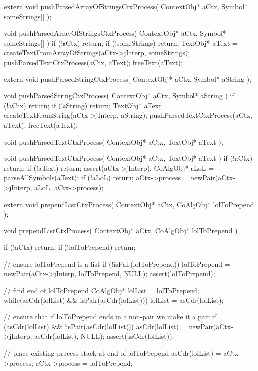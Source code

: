 \startCHeader
extern void pushParsedArrayOfStringsCtxProcess(
  ContextObj* aCtx,
  Symbol* someStrings[]
);
\stopCHeader

\startCCode
void pushParsedArrayOfStringsCtxProcess(
  ContextObj* aCtx,
  Symbol* someStrings[]
) {
  if (!aCtx) return;
  if (!someStrings) return;
  TextObj* aText =
    createTextFromArrayOfStrings(aCtx->jInterp, someStrings);
  pushParsedTextCtxProcess(aCtx, aText);
  freeText(aText);
}
\stopCCode

\startCHeader
extern void pushParsedStringCtxProcess(
  ContextObj* aCtx,
  Symbol* aString
);
\stopCHeader

\startCCode
void pushParsedStringCtxProcess(
  ContextObj* aCtx,
  Symbol* aString
) {
  if (!aCtx) return;
  if (!aString) return;
  TextObj* aText =
    createTextFromString(aCtx->jInterp, aString);
  pushParsedTextCtxProcess(aCtx, aText);
  freeText(aText);
}
\stopCCode

\startCHeader
void pushParsedTextCtxProcess(
  ContextObj* aCtx,
  TextObj* aText
);
\stopCHeader

\startCCode
void pushParsedTextCtxProcess(
  ContextObj* aCtx,
  TextObj* aText
) {
  if (!aCtx) return;
  if (!aText) return;
  assert(aCtx->jInterp);
  CoAlgObj* aLoL = parseAllSymbols(aText);
  if (!aLoL) return;
  aCtx->process = newPair(aCtx->jInterp, aLoL, aCtx->process);
}
\stopCCode

\startCHeader
extern void prependListCtxProcess(
  ContextObj* aCtx,
  CoAlgObj* lolToPrepend
);
\stopCHeader

\startCCode
void prependListCtxProcess(
  ContextObj* aCtx,
  CoAlgObj* lolToPrepend
) {
  if (!aCtx) return;
  if (!lolToPrepend) return;

  // ensure lolToPrepend is a list
  if (!isPair(lolToPrepend)) {
    lolToPrepend = newPair(aCtx->jInterp, lolToPrepend, NULL);
    assert(lolToPrepend);
  }

  // find end of lolToPrepend
  CoAlgObj* lolList = lolToPrepend;
  while(asCdr(lolList) && isPair(asCdr(lolList))) {
    lolList = asCdr(lolList);
  }

  // ensure that if lolToPrepend ends in a non-pair we make it a pair
  if (asCdr(lolList) && !isPair(asCdr(lolList))) {
    asCdr(lolList) = newPair(aCtx->jInterp, asCdr(lolList), NULL);
    assert(asCdr(lolList));
  }

  // place existing process stack at end of lolToPrepend
  asCdr(lolList)  = aCtx->process;
  aCtx->process   = lolToPrepend;
}
\stopCCode

